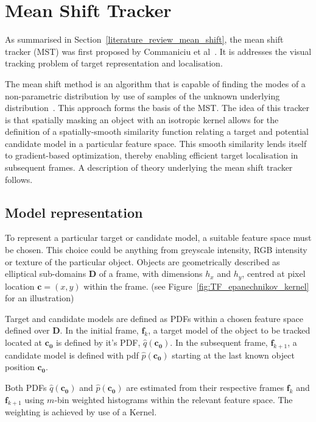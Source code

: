 

\section{Mean Shift Tracker}\label{theoretical_framework_mean_shift_tracker}
As summarised in Section~\ref{literature_review_mean_shift}, the mean shift
tracker (MST) was first proposed by Commaniciu et al~\cite{Comaniciu2003}. It is
addresses the visual tracking problem of target representation and localisation.

The mean shift method is an algorithm that is capable of finding the modes of a 
non-parametric distribution by use of samples of the unknown underlying
distribution~\cite{Comaniciu2002}. This approach forms the basis of the MST.
The idea of this tracker is that spatially masking an object with an
isotropic kernel allows for the definition of a spatially-smooth similarity
function relating a target and potential candidate model in a particular feature
space. This smooth similarity lends itself to gradient-based optimization,
thereby enabling efficient target localisation in subsequent frames.
A description of theory underlying the mean shift tracker follows.

\subsection{Model representation}
To represent a particular target or candidate model, a suitable feature space
must be chosen. This choice could be anything from greyscale intensity, RGB
intensity or texture of the particular object. Objects are geometrically described 
as elliptical sub-domains $\mathbf{D}$ of a frame, with dimensions $h_x$ and
$h_y$, centred at pixel location $\mathbf{c}=(x,y)$ within the frame. (see
Figure~\ref{fig:TF_epanechnikov_kernel} for an illustration)

Target and candidate models are defined as PDFs within a chosen feature
space defined over $\mathbf{D}$. In the initial frame, $\mathbf{f}_k$, a target
model of the object to be tracked located at $\mathbf{c_0}$ is defined by it's
PDF, $\hat{q}(\mathbf{c_0})$. In the subsequent frame, $\mathbf{f}_{k+1}$, a
candidate model is defined with pdf $\hat{p}(\mathbf{c_0})$ starting at the last
known object position $\mathbf{c_0}$. 

Both PDFs $\hat{q}(\mathbf{c_0})$ and $\hat{p}(\mathbf{c_0})$ are estimated from
their respective frames $\mathbf{f}_k$ and $\mathbf{f}_{k+1}$ using $m$-bin
weighted histograms within the relevant feature space. The weighting is achieved
by use of a Kernel. 

